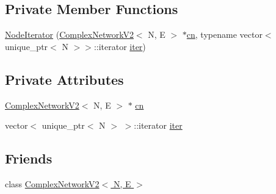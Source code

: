 \subsection*{Private Member Functions}
\begin{DoxyCompactItemize}
\item 
\hyperlink{class_complex_network_v2_1_1_node_iterator_a83cedeaa1bc7d17d25562f40753371a9}{Node\+Iterator} (\hyperlink{class_complex_network_v2}{Complex\+Network\+V2}$<$ N, E $>$ $\ast$\hyperlink{class_complex_network_v2_1_1_node_iterator_a7aca01bd523af976364fda7f3387dcfa}{cn}, typename vector$<$ unique\+\_\+ptr$<$ N $>$$>$\+::iterator \hyperlink{class_complex_network_v2_1_1_node_iterator_a0adc6d6ed60285560415c59e3e21fba8}{iter})
\end{DoxyCompactItemize}
\subsection*{Private Attributes}
\begin{DoxyCompactItemize}
\item 
\hyperlink{class_complex_network_v2}{Complex\+Network\+V2}$<$ N, E $>$ $\ast$ \hyperlink{class_complex_network_v2_1_1_node_iterator_a7aca01bd523af976364fda7f3387dcfa}{cn}
\item 
vector$<$ unique\+\_\+ptr$<$ N $>$ $>$\+::iterator \hyperlink{class_complex_network_v2_1_1_node_iterator_a0adc6d6ed60285560415c59e3e21fba8}{iter}
\end{DoxyCompactItemize}
\subsection*{Friends}
\begin{DoxyCompactItemize}
\item 
class \hyperlink{class_complex_network_v2_1_1_node_iterator_adb5cc6ad363066c6e1f832e8cb0bf2b8}{Complex\+Network\+V2$<$ N, E $>$}
\end{DoxyCompactItemize}


